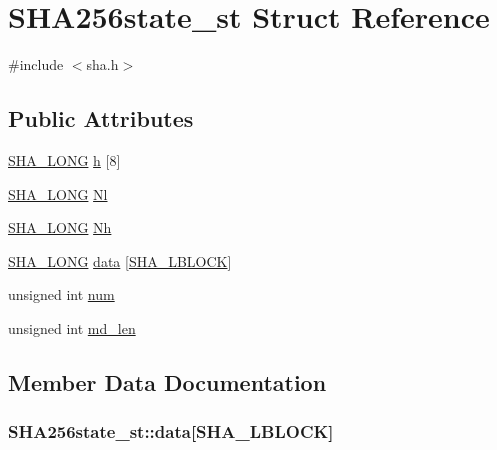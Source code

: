 \hypertarget{struct_s_h_a256state__st}{}\section{S\+H\+A256state\+\_\+st Struct Reference}
\label{struct_s_h_a256state__st}


{\ttfamily \#include $<$sha.\+h$>$}

\subsection*{Public Attributes}
\begin{DoxyCompactItemize}
\item 
\hyperlink{sha_8h_a1b2e699d6af9a09d35e23c231e415c6c}{S\+H\+A\+\_\+\+L\+O\+NG} \hyperlink{struct_s_h_a256state__st_a8a5e81981080254a7aa9ad6e11a4f253}{h} \mbox{[}8\mbox{]}
\item 
\hyperlink{sha_8h_a1b2e699d6af9a09d35e23c231e415c6c}{S\+H\+A\+\_\+\+L\+O\+NG} \hyperlink{struct_s_h_a256state__st_ac34962074aa1766470fae99d0e2aef9b}{Nl}
\item 
\hyperlink{sha_8h_a1b2e699d6af9a09d35e23c231e415c6c}{S\+H\+A\+\_\+\+L\+O\+NG} \hyperlink{struct_s_h_a256state__st_a02ad38687202dc1f21f78925599ec5ca}{Nh}
\item 
\hyperlink{sha_8h_a1b2e699d6af9a09d35e23c231e415c6c}{S\+H\+A\+\_\+\+L\+O\+NG} \hyperlink{struct_s_h_a256state__st_a1db17688ebaf2204d126f9232d00d5da}{data} \mbox{[}\hyperlink{sha_8h_a8902af97bc4411166213b43c6d2057d2}{S\+H\+A\+\_\+\+L\+B\+L\+O\+CK}\mbox{]}
\item 
unsigned int \hyperlink{struct_s_h_a256state__st_a64f6a539f36e85e82781026b68c968cf}{num}
\item 
unsigned int \hyperlink{struct_s_h_a256state__st_a8156b1d2d8afc2bd0f0875a943b9f36a}{md\+\_\+len}
\end{DoxyCompactItemize}


\subsection{Member Data Documentation}
\subsubsection[{\texorpdfstring{data}{data}}]{ S\+H\+A256state\+\_\+st\+::data\mbox{[}{\bf S\+H\+A\+\_\+\+L\+B\+L\+O\+CK}\mbox{]}}\hypertarget{struct_s_h_a256state__st_a1db17688ebaf2204d126f9232d00d5da}{}\label{struct_s_h_a256state__st_a1db17688ebaf2204d126f9232d00d5da}

